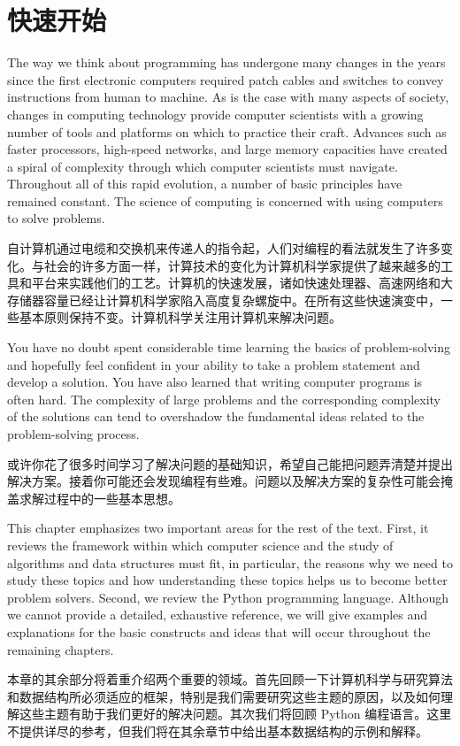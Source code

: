 \section{快速开始}

The way we think about programming has undergone many changes in the years since the first electronic computers required patch cables and switches to convey instructions from human to machine. As is the case with many aspects of society, changes in computing technology provide computer scientists with a growing number of tools and platforms on which to practice their craft. Advances such as faster processors, high-speed networks, and large memory capacities have created a spiral of complexity through which computer scientists must navigate. Throughout all of this rapid evolution, a number of basic principles have remained constant. The science of computing is concerned with using computers to solve problems.

自计算机通过电缆和交换机来传递人的指令起，人们对编程的看法就发生了许多变化。与社会的许多方面一样，计算技术的变化为计算机科学家提供了越来越多的工具和平台来实践他们的工艺。计算机的快速发展，诸如快速处理器、高速网络和大存储器容量已经让计算机科学家陷入高度复杂螺旋中。在所有这些快速演变中，一些基本原则保持不变。计算机科学关注用计算机来解决问题。


You have no doubt spent considerable time learning the basics of problem-solving and hopefully feel confident in your ability to take a problem statement and develop a solution. You have also learned that writing computer programs is often hard. The complexity of large problems and the corresponding complexity of the solutions can tend to overshadow the fundamental ideas related to the problem-solving process.

或许你花了很多时间学习了解决问题的基础知识，希望自己能把问题弄清楚并提出解决方案。接着你可能还会发现编程有些难。问题以及解决方案的复杂性可能会掩盖求解过程中的一些基本思想。



This chapter emphasizes two important areas for the rest of the text. First, it reviews the framework within which computer science and the study of algorithms and data structures must fit, in particular, the reasons why we need to study these topics and how understanding these topics helps us to become better problem solvers. Second, we review the Python programming language. Although we cannot provide a detailed, exhaustive reference, we will give examples and explanations for the basic constructs and ideas that will occur throughout the remaining chapters.

本章的其余部分将着重介绍两个重要的领域。首先回顾一下计算机科学与研究算法和数据结构所必须适应的框架，特别是我们需要研究这些主题的原因，以及如何理解这些主题有助于我们更好的解决问题。其次我们将回顾 Python 编程语言。这里不提供详尽的参考，但我们将在其余章节中给出基本数据结构的示例和解释。 
